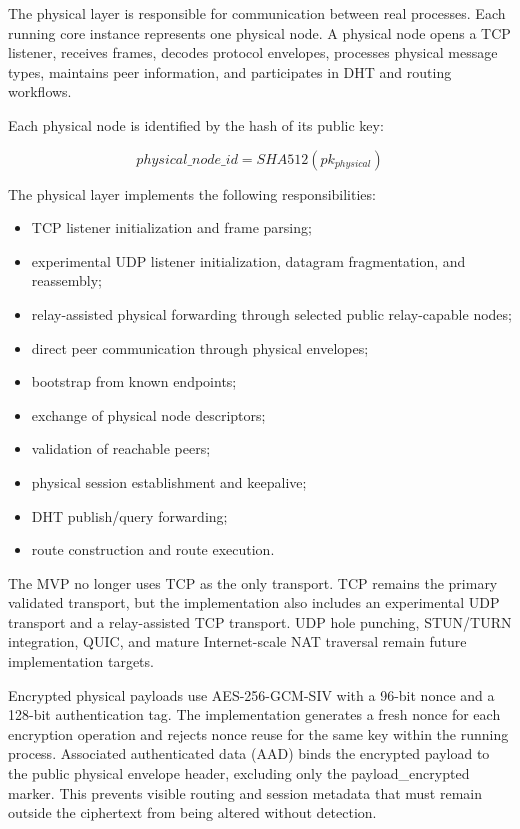 \documentclass[12pt,a4paper]{article}
\newcommand{\codebreak}[1]{{\footnotesize\ttfamily #1}}
\begin{document}
The physical layer is responsible for communication between real processes. Each running core instance represents one physical node. A physical node opens a TCP listener, receives frames, decodes protocol envelopes, processes physical message types, maintains peer information, and participates in DHT and routing workflows.

Each physical node is identified by the hash of its public key:

\begin{equation}
    physical\_node\_id = SHA512(pk_{physical})
\end{equation}

The physical layer implements the following responsibilities:

\begin{itemize}
    \item TCP listener initialization and frame parsing;
    \item experimental UDP listener initialization, datagram fragmentation, and reassembly;
    \item relay-assisted physical forwarding through selected public relay-capable nodes;
    \item direct peer communication through physical envelopes;
    \item bootstrap from known endpoints;
    \item exchange of physical node descriptors;
    \item validation of reachable peers;
    \item physical session establishment and keepalive;
    \item DHT publish/query forwarding;
    \item route construction and route execution.
\end{itemize}

The MVP no longer uses TCP as the only transport. TCP remains the primary validated transport, but the implementation also includes an experimental UDP transport and a relay-assisted TCP transport. UDP hole punching, STUN/TURN integration, QUIC, and mature Internet-scale NAT traversal remain future implementation targets.

Encrypted physical payloads use AES-256-GCM-SIV with a 96-bit nonce and a 128-bit authentication tag. The implementation generates a fresh nonce for each encryption operation and rejects nonce reuse for the same key within the running process. Associated authenticated data (AAD) binds the encrypted payload to the public physical envelope header, excluding only the \codebreak{payload\_\allowbreak{}encrypted} marker. This prevents visible routing and session metadata that must remain outside the ciphertext from being altered without detection.
\end{document}
